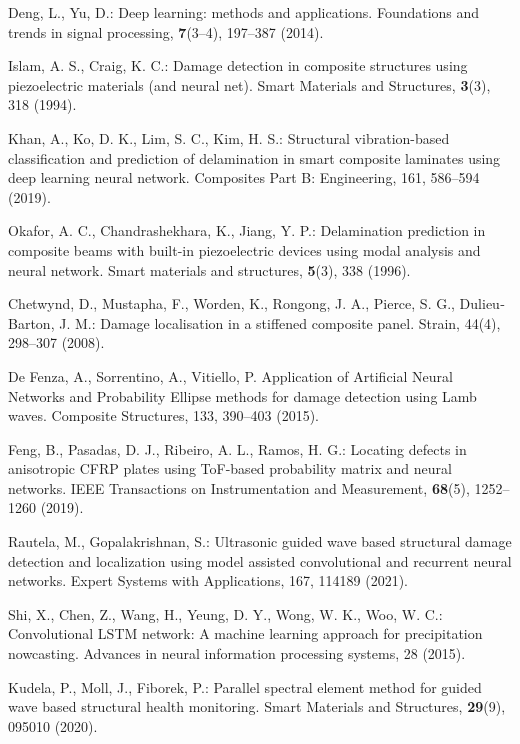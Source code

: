 \documentclass{IOS-Book-Article}
\begin{document}
\begin{thebibliography}{8}
	Deng, L., Yu, D.: Deep learning: methods and applications. Foundations and 
	trends in signal processing, \textbf{7}(3–4), 197--387 (2014).
	
	Islam, A. S., Craig, K. C.: Damage detection in composite structures using 
	piezoelectric materials (and neural net). Smart Materials and Structures, 
	\textbf{3}(3), 318 (1994).
	
	Khan, A., Ko, D. K., Lim, S. C., Kim, H. S.: Structural vibration-based 
	classification and prediction of delamination in smart composite laminates 
	using deep learning neural network. Composites Part B: Engineering, 161, 
	586--594 (2019).
	
	Okafor, A. C., Chandrashekhara, K., Jiang, Y. P.: Delamination prediction in 
	composite beams with built-in piezoelectric devices using modal analysis and 
	neural network. Smart materials and structures, \textbf{5}(3), 338  (1996).
	
	Chetwynd, D., Mustapha, F., Worden, K., Rongong, J. A., Pierce, S. G., 
	Dulieu‐Barton, J. M.: Damage localisation in a stiffened composite panel. 
	Strain, 44(4), 298--307 (2008).
	
	De Fenza, A., Sorrentino, A., Vitiello, P. Application of Artificial Neural 
	Networks and Probability Ellipse methods for damage detection using Lamb waves. 
	Composite Structures, 133, 390--403 (2015).
	
	Feng, B., Pasadas, D. J., Ribeiro, A. L., Ramos, H. G.: Locating defects in 
	anisotropic CFRP plates using ToF-based probability matrix and neural networks. 
	IEEE Transactions on Instrumentation and Measurement, \textbf{68}(5), 
	1252--1260 (2019).
	
	Rautela, M., Gopalakrishnan, S.: Ultrasonic guided wave based structural damage 
	detection and localization using model assisted convolutional and recurrent 
	neural networks. Expert Systems with Applications, 167, 114189 (2021).
	
	Shi, X., Chen, Z., Wang, H., Yeung, D. Y., Wong, W. K., Woo, W. C.: 
	Convolutional LSTM network: A machine learning approach for precipitation 
	nowcasting. Advances in neural information processing systems, 28 (2015).
	
	Kudela, P., Moll, J., Fiborek, P.: Parallel spectral element method for guided 
	wave based structural health monitoring. Smart Materials and Structures, 
	\textbf{29}(9), 095010 (2020).
	

\end{thebibliography}
\end{document}
